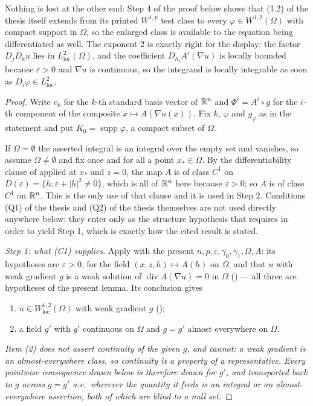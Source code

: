 \begin{helper}
Nothing is lost at the other end: Step 4 of the proof below shows that
(1.2) of the thesis itself extends from its printed $W^{1,p}$ test class to every
$\varphi\in W^{1,2}(\Omega)$ with compact support in $\Omega$, so the enlarged
class is available to the equation being differentiated as well.  The
exponent $2$ is exactly right for the display: the factor $D_jD_ku$ lies in
$L^2_{\mathrm{loc}}(\Omega)$, and the coefficient $D_{h_j}A^i(\nabla u)$ is
locally bounded because $\varepsilon>0$ and $\nabla u$ is continuous, so the
integrand is locally integrable as soon as $D_i\varphi\in L^2_{\mathrm{loc}}$.
\end{helper}
\begin{proof}
Write $e_k$ for the $k$-th standard basis vector of $\mathbb{R}^n$ and
$\Phi^i=A^i\circ g$ for the $i$-th component of the composite
$x\mapsto A(\nabla u(x))$.  Fix $k$, $\varphi$ and $g_\varphi$ as in the
statement and put $K_0=\operatorname{supp}\varphi$, a compact subset of
$\Omega$.

If $\Omega=\emptyset$ the asserted integral is an integral over the empty set
and vanishes, so assume $\Omega\ne\emptyset$ and fix once and for all a point
$x_\ast\in\Omega$.  By the differentiability clause of  applied at
$x_\ast$ and $z=0$, the map $A$ is of class $C^1$ on
$D(\varepsilon)=\{h:\varepsilon+|h|^2\ne0\}$, which is all of $\mathbb{R}^n$ here
because $\varepsilon>0$; so $A$ is of class $C^1$ on $\mathbb{R}^n$.  This is the only
use of that clause and it is used in Step 2.  Conditions (Q1) of the thesis and
(Q2) of the thesis themselves are not used directly anywhere below: they enter only
as the structure hypothesis that  requires in
order to yield Step 1, which is exactly how the cited result is stated.

\emph{Step 1: what (C1) supplies.}  Apply
 with the present
$n,p,\varepsilon,\gamma_0,\gamma_1,\Omega,A$: its hypotheses are $\varepsilon>0$,
 for the field $(x,z,h)\mapsto A(h)$ on $\Omega$,
and that $u$ with weak gradient $g$ is a weak solution of
$\operatorname{div}A(\nabla u)=0$ in $\Omega$ () --- all
three are hypotheses of the present lemma.  Its conclusion gives
\begin{enumerate}
\item $u\in W^{1,2}_{\mathrm{loc}}(\Omega)$ with weak gradient $g$
  ();
\item a field $g'$ with $g'$ continuous on $\Omega$ and $g=g'$ almost everywhere
  on $\Omega$.
\end{enumerate}
\emph{Item (2) does not assert continuity of the given $g$, and cannot: a weak
gradient is an almost-everywhere class, so continuity is a property of a
representative.  Every \emph{pointwise} consequence drawn below is therefore
drawn for $g'$, and transported back to $g$ across $g=g'$ a.e.\ wherever the
quantity it feeds is an integral or an almost-everywhere assertion, both of
which are blind to a null set.}


\end{proof}
